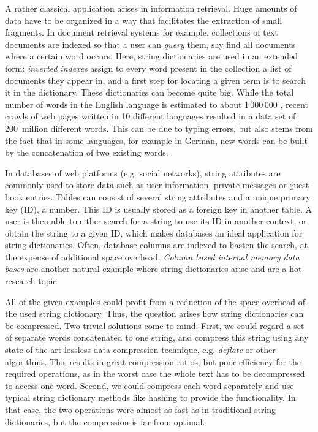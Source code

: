 \documentclass{llncs}
\newcommand{\newterm}[1]{\textit{#1}}
\begin{document}
A rather classical application arises in information retrieval. Huge amounts of data have to be organized in a way that facilitates the extraction of small fragments. In document retrieval systems for example, collections of text documents are indexed so that a user can \newterm{query} them, say find all documents where a certain word occurs. Here, string dictionaries are used in an extended form: \newterm{inverted indexes} assign to every word present in the collection a list of documents they appear in, and a first step for locating a given term is to search it in the dictionary. These dictionaries can become quite big. While the total number of words in the English language is estimated to about 1\,000\,000 \cite{MA11-qacumdb}, recent crawls of web pages written in 10 different languages resulted in a data set of 200~million different words. This can be due to typing errors, but also stems from the fact that in some languages, for example in German, new words can be built by the concatenation of two existing words.

In databases of web platforms (e.g. social networks), string attributes are commonly used to store data such as user information, private messages or guest-book entries. Tables can consist of several string attributes and a unique primary key (ID), a number. This ID is usually stored as a foreign key in another table. A user is then able to either search for a string to use its ID in another context, or obtain the string to a given ID, which makes databases an ideal application for string dictionaries. Often, database columns are indexed to hasten the search, at the expense of additional space overhead.
\emph{Column based internal memory data bases} are another natural example where string dictionaries arise and are a hot research topic.

All of the given examples could profit from a reduction of the space overhead of the used string dictionary. Thus, the question arises how string dictionaries can be compressed. Two trivial solutions come to mind: First, we could regard a set of separate words concatenated to one string, and compress this string using any state of the art lossless data compression technique, e.g. \textit{deflate} or other algorithms.
This results in great compression ratios, but poor efficiency for the required operations, as in the worst case the whole text has to be decompressed to access one word. Second, we could compress each word separately and use typical string dictionary methods like hashing to provide the functionality. In that case, the two operations were almost as fast as in traditional string dictionaries, but the compression is far from optimal.
\end{document}
